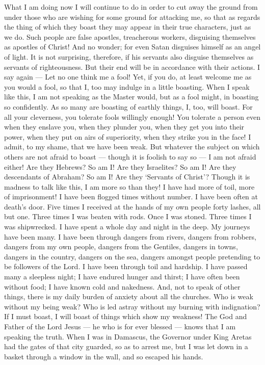  What I am doing now I will continue to do in order to cut
away the ground from under those who are wishing for some ground for
attacking me, so that as regards the thing of which they boast they may
appear in their true characters, just as we do.  Such
people are false apostles, treacherous workers, disguising themselves as
apostles of Christ!  And no wonder; for even Satan
disguises himself as an angel of light.  It is not
surprising, therefore, if his servants also disguise themselves as
servants of righteousness. But their end will be in accordance with
their actions.  I say again --- Let no one think me a fool!
Yet, if you do, at least welcome me as you would a fool, so that I, too
may indulge in a little boasting.  When I speak like this,
I am not speaking as the Master would, but as a fool might, in boasting
so confidently.  As so many are boasting of earthly things,
I, too, will boast.  For all your cleverness, you tolerate
fools willingly enough!  You tolerate a person even when
they enslave you, when they plunder you, when they get you into their
power, when they put on airs of superiority, when they strike you in the
face!  I admit, to my shame, that we have been weak. But
whatever the subject on which others are not afraid to boast --- though
it is foolish to say so --- I am not afraid either!  Are
they Hebrews? So am I! Are they Israelites? So am I! Are they
descendants of Abraham? So am I!  Are they `Servants of
Christ'? Though it is madness to talk like this, I am more so than they!
I have had more of toil, more of imprisonment! I have been flogged times
without number. I have been often at death's door.  Five
times I received at the hands of my own people forty lashes, all but
one.  Three times I was beaten with rods. Once I was
stoned. Three times I was shipwrecked. I have spent a whole day and
night in the deep.  My journeys have been many. I have been
through dangers from rivers, dangers from robbers, dangers from my own
people, dangers from the Gentiles, dangers in towns, dangers in the
country, dangers on the sea, dangers amongst people pretending to be
followers of the Lord.  I have been through toil and
hardship. I have passed many a sleepless night; I have endured hunger
and thirst; I have often been without food; I have known cold and
nakedness.  And, not to speak of other things, there is my
daily burden of anxiety about all the churches.  Who is
weak without my being weak? Who is led astray without my burning with
indignation?  If I must boast, I will boast of things which
show my weakness!  The God and Father of the Lord Jesus ---
he who is for ever blessed --- knows that I am speaking the truth.
 When I was in Damascus, the Governor under King Aretas had
the gates of that city guarded, so as to arrest me,  but I
was let down in a basket through a window in the wall, and so escaped
his hands.

